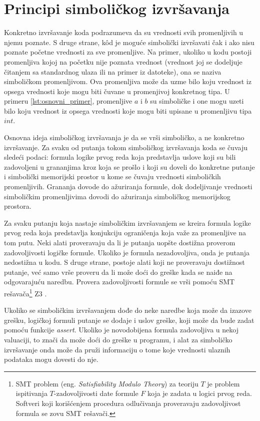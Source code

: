 \documentclass[12pt,oneside]{memoir}
\begin{document}
\section{Principi simboličkog izvršavanja}

Konkretno izvršavanje koda podrazumeva da su vrednosti svih promenljivih u njemu poznate. S druge strane, k\^od je moguće simbolički izvršavati čak i ako nisu poznate početne vrednosti za sve promenljive. Na primer, ukoliko u kodu postoji promenljiva kojoj na početku nije poznata vrednost (vrednost joj se dodeljuje čitanjem sa standardnog ulaza ili na primer iz datoteke), ona se naziva simboličkom  promenljivom. Ova promenljiva može da uzme bilo koju vrednost iz opsega vrednosti koje mogu biti čuvane u promenjivoj konkretnog tipa. U primeru \ref{lst:osnovni_primer}, promenljive $a$ i $b$ su simboličke i one mogu uzeti bilo koju vrednost iz opsega vrednosti koje mogu biti upisane u promenljivu tipa $int$.

\indent Osnovna ideja simboličkog izvršavanja je da se vrši simboličko, a ne konkretno izvršavanje. Za svaku od putanja tokom simboličkog izvršavanja koda se čuvaju sledeći podaci: formula logike prvog reda koja predstavlja uslove koji su bili zadovoljeni u grananjima kroz koja se prošlo i koji su doveli do konkretne putanje i simbolički memorijski prostor u kome se čuvaju vrednosti simboličkih promenljivih. Grananja dovode do ažuriranja formule, dok dodeljivanje vrednosti simboličkim promenljivima dovodi do ažuriranja simboličkog memorijskog prostora. 

\indent Za svaku putanju koja nastaje simboličkim izvršavanjem se kreira formula logike prvog reda koja predstavlja konjukciju ograničenja koja važe za promenljive na tom putu. Neki alati proveravaju da li je putanja uopšte dostižna proverom zadovoljivosti logičke formule. Ukoliko je formula nezadovoljiva, onda je putanja nedostižna u kodu. S druge strane, postoje alati koji ne proveravaju dostižnost putanje, već samo vrše proveru da li može doći do greške kada se naiđe na odgovarajuću naredbu. Provera zadovoljivosti formule se vrši pomoću SMT rešavača\footnote[1]{SMT problem (eng. \textit{Satisfiability Modulo Theory}) za teoriju $T$ je problem ispitivanja $T$-zadovoljivosti date formule $F$ koja je zadata u logici prvog reda. Softveri koji korišćenjem procedura odlučivanja proveravaju zadovoljivost formula se zovu SMT rešavači.} \cite{SMT} Z3 \cite{Z3}. 

Ukoliko se simboličkim izvršavanjem dođe do neke naredbe koja može da izazove grešku, logičkoj formuli putanje se dodaje i uslov greške, koji može da bude zadat pomoću funkcije \textit{assert}. Ukoliko je novodobijena formula zadovoljiva u nekoj valuaciji, to znači da može doći do greške u programu, i alat za simboličko izvršavanje onda može da pruži informaciju o tome koje vrednosti ulaznih podataka mogu dovesti do nje.
\end{document}
